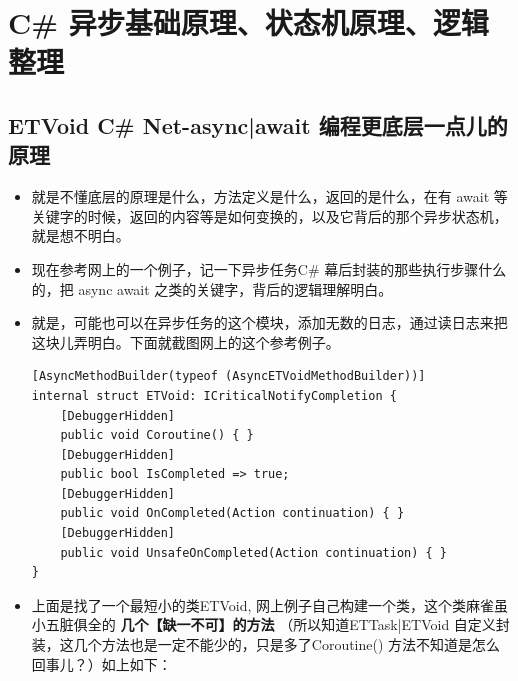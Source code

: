 \documentclass[9pt, b5paper]{article}
\begin{document}
\section{C\# 异步基础原理、状态机原理、逻辑整理}
\label{sec:org68d3a12}
\subsection{ETVoid C\# Net-async|await 编程更底层一点儿的原理}
\label{sec:org22b7470}
\begin{itemize}
\item 就是不懂底层的原理是什么，方法定义是什么，返回的是什么，在有 await 等关键字的时候，返回的内容等是如何变换的，以及它背后的那个异步状态机，就是想不明白。
\item 现在参考网上的一个例子，记一下异步任务C\# 幕后封装的那些执行步骤什么的，把 async await 之类的关键字，背后的逻辑理解明白。
\item 就是，可能也可以在异步任务的这个模块，添加无数的日志，通过读日志来把这块儿弄明白。下面就截图网上的这个参考例子。
\begin{verbatim}
[AsyncMethodBuilder(typeof (AsyncETVoidMethodBuilder))]
internal struct ETVoid: ICriticalNotifyCompletion {
    [DebuggerHidden]
    public void Coroutine() { }
    [DebuggerHidden]
    public bool IsCompleted => true;
    [DebuggerHidden]
    public void OnCompleted(Action continuation) { }
    [DebuggerHidden]
    public void UnsafeOnCompleted(Action continuation) { }
}
\end{verbatim}
\item 上面是找了一个最短小的类ETVoid, 网上例子自己构建一个类，这个类麻雀虽小五脏俱全的 \textbf{几个【缺一不可】的方法} （所以知道ETTask|ETVoid 自定义封装，这几个方法也是一定不能少的，只是多了Coroutine() 方法不知道是怎么回事儿？）如上如下：
\end{itemize}
\end{document}
